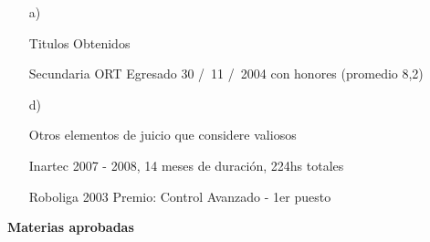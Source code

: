 \begin{enumerate}[leftmargin=0.8cm]

  \item[a)]{Titulos Obtenidos

    \begin{itemize}[leftmargin=0.2cm]

      {Secundaria ORT}
      {Egresado 30 \slash \ 11 \slash \ 2004 con honores (promedio 8,2)}

    \end{itemize}

  }

  \item[d)]{Otros elementos de juicio que considere valiosos

    \begin{itemize}[leftmargin=0.2cm]

      {Inartec}
      {2007 - 2008, 14 meses de duración, 224hs totales}{}

      {Roboliga 2003}
      {Premio: Control Avanzado - 1er puesto}{}

    \end{itemize}

  }

\end{enumerate}

\textbf{Materias aprobadas}

